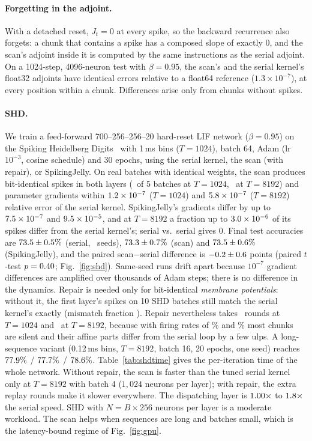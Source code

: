 \documentclass[10pt]{article}
\theoremstyle{remark}
\begin{document}
\paragraph{Forgetting in the adjoint.}
With a detached reset, $J_t=0$ at every spike, so the backward recurrence also forgets: a chunk that contains a spike has a composed slope of exactly $0$, and the scan's adjoint inside it is computed by the same instructions as the serial adjoint. On a 1024-step, 4096-neuron test with $\beta=0.95$, the scan's and the serial kernel's float32 adjoints have identical errors relative to a float64 reference ($1.3\times10^{-7}$), at every position within a chunk. Differences arise only from chunks without spikes.

\paragraph{SHD.}
We train a feed-forward 700--256--256--20 hard-reset LIF network ($\beta=0.95$) on the Spiking Heidelberg Digits~\citep{cramer2020shd} with 1\,ms bins ($T=1024$), batch 64, Adam (lr $10^{-3}$, cosine schedule) and 30 epochs, using the serial kernel, the scan (with repair), or SpikingJelly. On real batches with identical weights, the scan produces bit-identical spikes in both layers (\SpikesEqScanShort\ of 5 batches at $T=1024$, \SpikesEqScanLong\ at $T=8192$) and parameter gradients within $1.2\times10^{-7}$ ($T=1024$) and $5.8\times10^{-7}$ ($T=8192$) relative error of the serial kernel. SpikingJelly's gradients differ by up to $7.5\times10^{-7}$ and $9.5\times10^{-5}$, and at $T=8192$ a fraction up to $3.0\times10^{-6}$ of its spikes differ from the serial kernel's; serial vs.\ serial gives 0. Final test accuracies are $73.5\pm0.5\%$ (serial, \NSeedsSerial\ seeds), $73.3\pm0.7\%$ (scan) and $73.5\pm0.6\%$ (SpikingJelly), and the paired scan$-$serial difference is $-0.2\pm0.6$ points (paired $t$-test $p=0.40$; Fig.~\ref{fig:shd}). Same-seed runs drift apart because $10^{-7}$ gradient differences are amplified over thousands of Adam steps; there is no difference in the dynamics. Repair is needed only for bit-identical \emph{membrane potentials}: without it, the first layer's spikes on 10 SHD batches still match the serial kernel's exactly (mismatch fraction \NoRepairMismatch). Repair nevertheless takes \RepairRoundsShort\ rounds at $T=1024$ and \RepairRoundsLong\ at $T=8192$, because with firing rates of \FireRateShort\% and \FireRateLong\% most chunks are silent and their affine parts differ from the serial loop by a few ulps. A long-sequence variant (0.12\,ms bins, $T=8192$, batch 16, 20 epochs, one seed) reaches $77.9\%$ / $77.7\%$ / $78.6\%$. Table~\ref{tab:shdtime} gives the per-iteration time of the whole network. Without repair, the scan is faster than the tuned serial kernel only at $T=8192$ with batch 4 ($1{,}024$ neurons per layer); with repair, the extra replay rounds make it slower everywhere. The dispatching layer is $1.00\times$ to $1.8\times$ the serial speed. SHD with $N=B\times256$ neurons per layer is a moderate workload. The scan helps when sequences are long and batches small, which is the latency-bound regime of Fig.~\ref{fig:gpu}.
\end{document}
